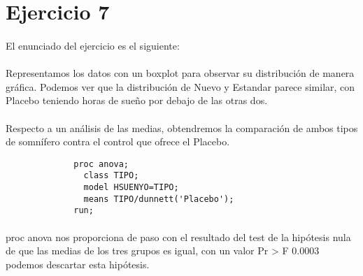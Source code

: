\documentclass{article}
\begin{document}
  \maketitle

  \section{Ejercicio 7}

    \paragraph{}
    El enunciado del ejercicio es el siguiente: 

    \paragraph{}
    Representamos los datos con un boxplot para observar su distribución de manera gráfica. Podemos ver que la distribución de Nuevo y Estandar parece similar, con Placebo teniendo horas de sueño por debajo de las otras dos.

    \paragraph{}
    Respecto a un análisis de las medias, obtendremos la comparación de ambos tipos de somnífero contra el control que ofrece el Placebo.


    \begin{figure}[h]
			\centering
      \begin{verbatim}
        proc anova;
          class TIPO;
          model HSUENYO=TIPO;
          means TIPO/dunnett('Placebo');
        run;
      \end{verbatim}
			\caption{}
			\label{code:sas_1}
		\end{figure}

    \paragraph{}
    proc anova nos proporciona de paso con el resultado del test de la hipótesis nula de que las medias de los tres grupos es igual, con un valor Pr > F 0.0003 podemos descartar esta hipótesis.
\end{document}
